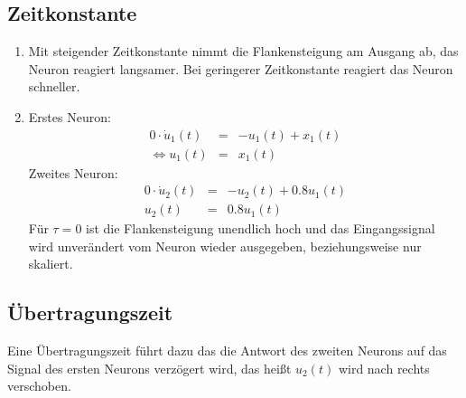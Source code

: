 \documentclass[DIN, pagenumber=false, fontsize=11pt, parskip=half]{scrartcl}
\begin{document}
    \subsection{Zeitkonstante}
    \begin{enumerate}[label=(\alph*)]
        \item Mit steigender Zeitkonstante nimmt die Flankensteigung am Ausgang ab, das Neuron reagiert langsamer.
            Bei geringerer Zeitkonstante reagiert das Neuron schneller. %
        \item           
            Erstes Neuron:
            \begin{eqnarray*}
                0 \cdot \dot{u}_1(t) &=& -u_1(t) + x_1(t) \\
                \Leftrightarrow u_1(t) &=& x_1(t) 
            \end{eqnarray*}
            Zweites Neuron:
            \begin{eqnarray*}
                0 \cdot \dot{u}_2(t) &=& -u_2(t) + 0.8 u_1(t) \\
                u_2(t) &=& 0.8 u_1(t) 
            \end{eqnarray*}
            Für $\tau = 0$ ist die Flankensteigung unendlich hoch und das Eingangssignal wird unverändert vom
            Neuron wieder ausgegeben, beziehungsweise nur skaliert.
    \end{enumerate}

    \subsection{Übertragungszeit}
    Eine Übertragungszeit führt dazu das die Antwort des zweiten Neurons auf das Signal des ersten Neurons verzögert
    wird, das heißt $u_2(t)$ wird nach rechts verschoben.
\end{document}
